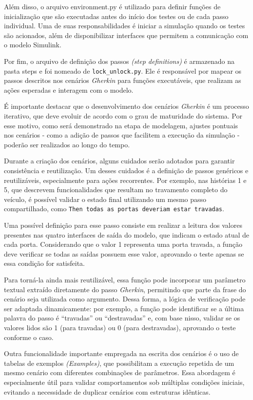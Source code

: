 Além disso, o arquivo environment.py é utilizado para definir funções de inicialização que são executadas antes do início dos testes ou de cada passo individual. 
Uma de suas responsabilidades é iniciar a simulação quando os testes são acionados, além de disponibilizar interfaces que permitem a comunicação com o modelo Simulink.

Por fim, o arquivo de definição dos passos \textit{(step definitions)} é armazenado na pasta steps e foi nomeado de \texttt{lock\_unlock.py}. Ele é responsável por mapear os 
passos descritos nos cenários \textit{Gherkin} para funções executáveis, que realizam as ações esperadas e interagem com o modelo.

É importante destacar que o desenvolvimento dos cenários \textit{Gherkin} é um processo iterativo, que deve evoluir de acordo com o grau de maturidade do sistema. 
Por esse motivo, como será demonstrado na etapa de modelagem, ajustes pontuais nos cenários - como a adição de passos que facilitem a execução da simulação - 
poderão ser realizados ao longo do tempo.

Durante a criação dos cenários, alguns cuidados serão adotados para garantir consistência e reutilização. Um desses cuidados é a definição de passos genéricos 
e reutilizáveis, especialmente para ações recorrentes. Por exemplo, nas histórias 1 e 5, que descrevem funcionalidades que resultam no travamento completo do 
veículo, é possível validar o estado final utilizando um mesmo passo compartilhado, como \texttt{Then todas as portas deveriam estar travadas}.

Uma possível definição para esse passo consiste em realizar a leitura dos valores presentes nas quatro interfaces de saída do modelo, que indicam o estado atual 
de cada porta. Considerando que o valor 1 representa uma porta travada, a função deve verificar se todas as saídas possuem esse valor, aprovando o teste apenas se 
essa condição for satisfeita.

Para torná-la ainda mais reutilizável, essa função pode incorporar um parâmetro textual extraído diretamente do passo \textit{Gherkin}, permitindo que parte da frase do 
cenário seja utilizada como argumento. Dessa forma, a lógica de verificação pode ser adaptada dinamicamente: por exemplo, a função pode identificar se a última 
palavra do passo é ``travadas'' ou ``destravadas'' e, com base nisso, validar se os valores lidos são 1 (para travadas) ou 0 (para destravadas), aprovando o teste 
conforme o caso.

Outra funcionalidade importante empregada na escrita dos cenários é o uso de tabelas de exemplos \textit{(Examples)}, que possibilitam a execução repetida de um mesmo 
cenário com diferentes combinações de parâmetros. Essa abordagem é especialmente útil para validar comportamentos sob múltiplas condições iniciais, evitando a 
necessidade de duplicar cenários com estruturas idênticas.

